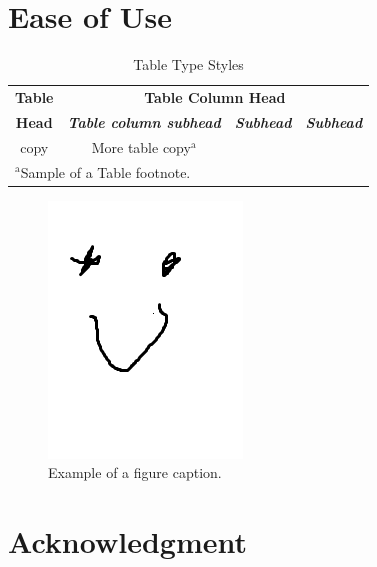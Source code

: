 \documentclass[conference]{IEEEtran}
\begin{document}
\section{Ease of Use}

\begin{table}[htbp]
\caption{Table Type Styles}
\begin{center}
\begin{tabular}{|c|c|c|c|}
\hline
\textbf{Table}&\multicolumn{3}{|c|}{\textbf{Table Column Head}} \\
\cline{2-4} 
\textbf{Head} & \textbf{\textit{Table column subhead}}& \textbf{\textit{Subhead}}& \textbf{\textit{Subhead}} \\
\hline
copy& More table copy$^{\mathrm{a}}$& &  \\
\hline
\multicolumn{4}{l}{$^{\mathrm{a}}$Sample of a Table footnote.}
\end{tabular}
\label{tab1}
\end{center}
\end{table}

\begin{figure}[htbp]
\centerline{\includegraphics{fig1.png}}
\caption{Example of a figure caption.}
\label{fig}
\end{figure}



\section*{Acknowledgment}









\end{document}
